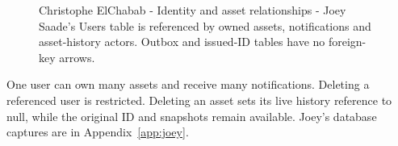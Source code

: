 \documentclass[11pt,a4paper]{article}
\begin{document}
\begin{figure}[H]\centering
{}
\caption{Christophe ElChabab - Identity and asset relationships - Joey Saade's Users table is referenced by owned assets, notifications and asset-history actors. Outbox and issued-ID tables have no foreign-key arrows.}
\label{fig:joey-schema}
\end{figure}
One user can own many assets and receive many notifications. Deleting a referenced user is restricted. Deleting an asset sets its live history reference to null, while the original ID and snapshots remain available. Joey's database captures are in Appendix~\ref{app:joey}.
\end{document}
